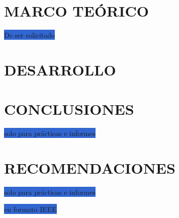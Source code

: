 \documentclass[12pt]{article}
\begin{document}
\vspace{0.5cm}

\section*{MARCO TEÓRICO}
\colorbox{highlight}{De ser solicitado} \cite{vargas2013exploiting}

\vspace{0.5cm}

\section*{DESARROLLO}

\vspace{0.5cm}

\section*{CONCLUSIONES}
\colorbox{highlight}{solo para prácticas e informes}

\vspace{0.5cm}

\section*{RECOMENDACIONES}
\colorbox{highlight}{solo para prácticas e informes}

\vspace{0.5cm}


\renewcommand{\refname}{\MakeUppercase{REFERENCIAS}}


\colorbox{highlight}{en formato IEEE}
\end{document}

